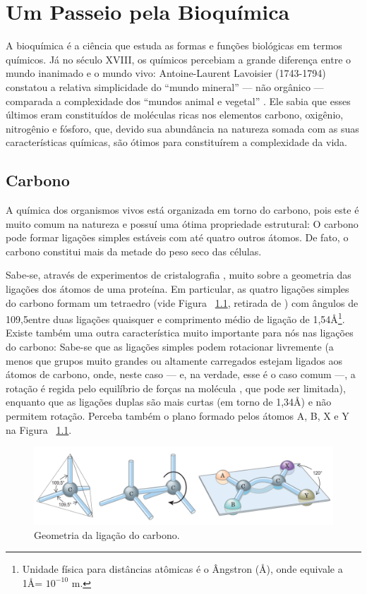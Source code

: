\chapter{Um Passeio pela Bioquímica \label{ap:biomol}}
A bioquímica é a ciência que estuda as formas e funções biológicas em termos químicos. Já no século XVIII, os químicos percebiam a grande diferença entre o mundo inanimado e o mundo vivo: Antoine-Laurent Lavoisier (1743-1794) constatou a relativa simplicidade do ``mundo mineral'' --- não orgânico --- comparada a complexidade dos ``mundos animal e vegetal'' \cite{bioquimicaLehninger}. Ele sabia que esses últimos eram constituídos de moléculas ricas nos elementos carbono, oxigênio, nitrogênio e fósforo, que, devido sua abundância na natureza somada com as suas características químicas, são ótimos para constituírem a complexidade da vida.

\section*{Carbono}
A química dos organismos vivos está organizada em torno do carbono, pois este é muito comum na natureza e possuí uma ótima propriedade estrutural: O carbono pode formar ligações simples estáveis com até quatro outros átomos. De fato, o carbono constitui mais da metade do peso seco das células. 

Sabe-se, através de experimentos de cristalografia \cite{ramachandran1974MolStructure}, muito sobre a geometria das ligações dos átomos de uma proteína. Em particular, as quatro ligações simples do carbono formam um tetraedro (vide Figura ~\ref{fig:carbono}, retirada de \cite{bioquimicaLehninger}) com ângulos de 109,5\textdegree entre duas ligações quaisquer e comprimento médio de ligação de 1,54\AA\footnote[1]{Unidade física para distâncias atômicas é o Ângstron (\AA), onde equivale a 1\AA = $10^{-10}$ m.}. Existe também uma outra característica muito importante para nós nas ligações do carbono: Sabe-se que as ligações simples podem rotacionar livremente (a menos que grupos muito grandes ou altamente carregados estejam ligados aos átomos de carbono, onde, neste caso --- e, na verdade, esse é o caso comum ---, a rotação é regida pelo equilíbrio de forças na molécula \cite{carlileTese}, que pode ser limitada), enquanto que as ligações duplas são mais curtas (em torno de 1,34\AA) e não permitem rotação. Perceba também o plano formado pelos átomos A, B, X e Y na Figura ~\ref{fig:carbono}.

\begin{figure}[H]
	\begin{center}
		\includegraphics[width=1\linewidth]{secProteins/figures/carbono.png}
	\end{center}
	\caption{Geometria da ligação do carbono.}
	\label{fig:carbono}
\end{figure}

